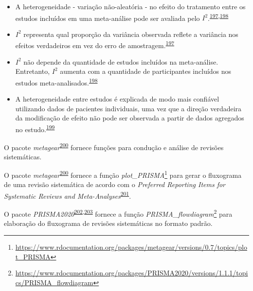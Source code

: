 \documentclass[
  a4paper,
]{book}
\renewcommand{\href}[2]{#2\footnote{\url{#1}}}
\newenvironment{infobox}[1]
  {
  \begin{itemize}
  \renewcommand{\labelitemi}{
    \raisebox{-.7\height}[0pt][0pt]{
      {\setkeys{Gin}{width=3em,keepaspectratio}
        \texttt{[image: \#1]}}
    }
  }
  \setlength{\fboxsep}{1em}
  \begin{blackbox}
  \item
  }
  {
  \end{blackbox}
  \end{itemize}
  }
\begin{document}
\begin{itemize}
\item
  A heterogeneidade - variação não-aleatória - no efeito do tratamento entre os estudos incluídos em uma meta-análise pode ser avaliada pelo \(I^{2}\).\textsuperscript{\protect\hyperlink{ref-Borenstein2022}{197},\protect\hyperlink{ref-Ruxfccker2008}{198}}
\item
  \(I^{2}\) representa qual proporção da variância observada reflete a variância nos efeitos verdadeiros em vez do erro de amostragem.\textsuperscript{\protect\hyperlink{ref-Borenstein2022}{197}}
\item
  \(I^{2}\) não depende da quantidade de estudos incluídos na meta-análise. Entretanto, \(I^{2}\) aumenta com a quantidade de participantes incluídos nos estudos meta-analisados.\textsuperscript{\protect\hyperlink{ref-Ruxfccker2008}{198}}
\item
  A heterogeneidade entre estudos é explicada de modo mais confiável utilizando dados de pacientes individuais, uma vez que a direção verdadeira da modificação de efeito não pode ser observada a partir de dados agregados no estudo.\textsuperscript{\protect\hyperlink{ref-degrooth2023}{199}}
\end{itemize}

\begin{infobox}{images/Rlogo}
O pacote \emph{metagear}\textsuperscript{\protect\hyperlink{ref-metagear}{200}} fornece funções para condução e análise de revisões sistemáticas.

\end{infobox}

\begin{infobox}{images/Rlogo}
O pacote \emph{metagear}\textsuperscript{\protect\hyperlink{ref-metagear}{200}} fornece a função \href{https://www.rdocumentation.org/packages/metagear/versions/0.7/topics/plot_PRISMA}{\emph{plot\_PRISMA}} para gerar o fluxograma de uma revisão sistemática de acordo com o \emph{Preferred Reporting Items for Systematic Reviews and Meta-Analyses}\textsuperscript{\protect\hyperlink{ref-Moher2015}{201}}.

\end{infobox}

\begin{infobox}{images/Rlogo}
O pacote \emph{PRISMA2020}\textsuperscript{\protect\hyperlink{ref-PRISMA2020-2}{202},\protect\hyperlink{ref-PRISMA2020}{203}} fornece a função \href{https://www.rdocumentation.org/packages/PRISMA2020/versions/1.1.1/topics/PRISMA_flowdiagram}{\emph{PRISMA\_flowdiagram}} para elaboração do fluxograma de revisões sistemáticas no formato padrão.

\end{infobox}
\end{document}

